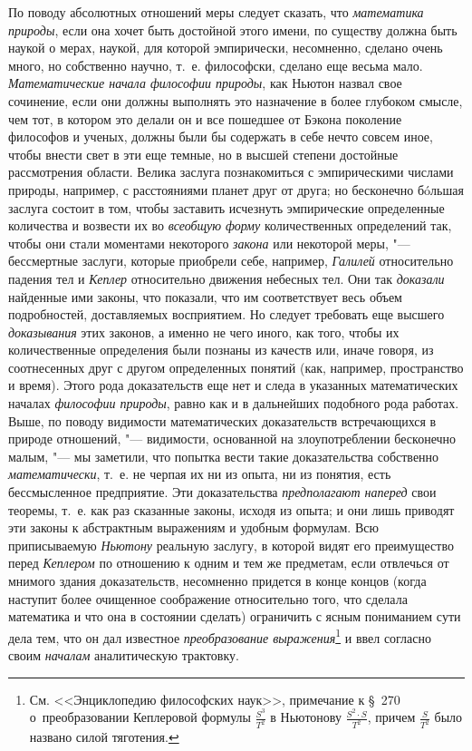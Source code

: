 По поводу абсолютных отношений меры следует сказать, что
{\em математика природы}, если она хочет быть достойной
этого имени, по существу должна быть наукой о мерах, наукой, для которой
эмпирически, несомненно, сделано очень много, но собственно научно, т.~е.
философски, сделано еще весьма мало.
{\em Математические начала философии природы}, как
Ньютон назвал свое сочинение, если они должны выполнять это назначение в
более глубоком смысле, чем тот, в котором это делали он и все пошедшее от
Бэкона поколение философов и ученых, должны были бы содержать в себе нечто
совсем иное, чтобы внести свет в эти еще темные, но в высшей степени
достойные рассмотрения области. Велика заслуга познакомиться с
эмпирическими числами природы, например, с расстояниями планет друг от
друга; но бесконечно бóльшая заслуга состоит в том, чтобы заставить
исчезнуть эмпирические определенные количества и возвести их во
{\em всеобщую форму} количественных определений так,
чтобы они стали моментами некоторого {\em закона} или
некоторой меры, "--- бессмертные заслуги, которые приобрели себе, например,
{\em Галилей} относительно падения тел и
{\em Кеплер} относительно движения небесных тел. Они
так {\em доказали} найденные ими законы, что показали,
что им соответствует весь объем подробностей, доставляемых восприятием. Но
следует требовать еще высшего {\em доказывания} этих
законов, а именно не чего иного, как того, чтобы их количественные
определения были познаны из качеств или, иначе говоря, из соотнесенных друг
с другом определенных понятий (как, например, пространство и время). Этого
рода доказательств еще нет и следа в указанных математических началах
{\em философии природы}, равно как и в дальнейших
подобного рода работах. Выше, по поводу видимости математических
доказательств встречающихся в природе отношений, "--- видимости, основанной на
злоупотреблении бесконечно малым, "--- мы заметили, что попытка вести такие
доказательства собственно {\em математически}, т.~е. не
черпая их ни из опыта, ни из понятия, есть бессмысленное предприятие. Эти
доказательства {\em предполагают наперед} свои
теоремы, т.~е. как раз сказанные законы, исходя из опыта; и они лишь
приводят эти законы к абстрактным выражениям и удобным формулам. Всю
приписываемую {\em Ньютону} реальную заслугу, в которой
видят его преимущество перед {\em Кеплером} по
отношению к одним и тем же предметам, если отвлечься от мнимого здания
доказательств, несомненно придется в конце концов (когда наступит более
очищенное соображение относительно того, что сделала математика и что она в
состоянии сделать) ограничить с ясным пониманием сути дела тем, что он дал
известное {\em преобразование выражения}\footnote{См. <<Энциклопедию
философских наук>>, примечание к \S~270 о~преобразовании Кеплеровой формулы
$\frac{S^3}{T^2}$ в Ньютонову $\frac{S^2\cdot S}{T^2}$,
причем $\frac{S}{T^2}$ было названо силой тяготения.}
и ввел согласно своим {\em началам} аналитическую трактовку.

